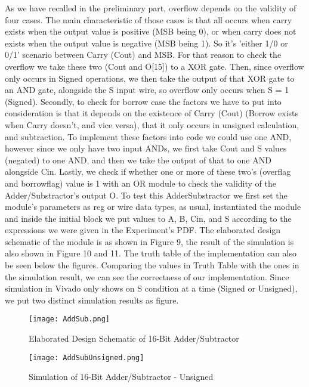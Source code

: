 \documentclass[pdftex,12pt,a4paper]{article}
\begin{document}
As we have recalled in the preliminary part, overflow depends on the validity of four cases. The main characteristic of those cases is that all occurs when carry exists when the output value is positive (MSB being 0), or when carry does not exists when the output value is negative (MSB being 1). So it's 'either 1/0 or 0/1' scenario between Carry  (Cout) and MSB. For that reason to check the overflow we take these two (Cout and O[15]) to a XOR gate. Then, since overflow only occurs in Signed operations, we then take the output of that XOR gate to an AND gate, alongside the S input wire, so overflow only occurs when S = 1 (Signed). Secondly, to check for borrow case the factors we have to put into consideration is that it depends on the existence of Carry (Cout) (Borrow exists when Carry doesn't, and vice versa), that it only occurs in unsigned calculation, and subtraction. To implement these factors into code we could use one AND, however since we only have two input ANDs, we first take Cout and S values (negated) to one AND, and then we take the output of that to one AND alongside Cin. Lastly, we check if whether one or more of these two's (overflag and borrowflag) value is 1 with an OR module to check the validity of the Adder/Substractor's output O. To test this AdderSubstractor we first set the module's parameters as reg or wire data types, as usual, instantiated the module and inside the initial block we put values to A, B, Cin, and S according to the expressions we were given in the Experiment's PDF. The elaborated design schematic of the module is as shown in Figure 9, the result of the simulation is also shown in Figure 10 and 11. The truth table of the implementation can also be seen below the figures. Comparing the values in Truth Table with the ones in the simulation result, we can see the correctness of our implementation. Since simulation in Vivado only shows on S condition at a time (Signed or Unsigned), we put two distinct simulation results as figure.

\begin{figure}[ht]
	\centering
	\texttt{[image: AddSub.png]}
	\caption{Elaborated Design Schematic of 16-Bit Adder/Subtractor}
	\label{fig1}
\end{figure}


\begin{figure}[ht]
	\centering
	\texttt{[image: AddSubUnsigned.png]}
	\caption{Simulation of 16-Bit Adder/Subtractor - Unsigned}
	\label{fig1}
\end{figure}
\end{document}
